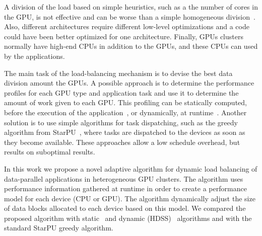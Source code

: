 \documentclass[journal]{IEEEtran}
\begin{document}
A division of the load based on simple heuristics, such as a the number of cores
in the GPU, is not effective and can be worse than a simple homogeneous
division~\cite{raphael}. Also, different architectures require different
low-level optimizations and a code could have been better optimized for one
architecture. Finally, GPUs clusters normally have high-end CPUs in addition to
the GPUs, and these CPUs can used by the applications.

%

The main task of the load-balancing mechanism is to devise the best data
division amount the GPUs. A possible approach is to determine the performance
profiles for each GPU type and application task and use it to determine the
amount of work given to each GPU. This profiling can be statically computed, before the
execution of the application~\cite{raphael}, or dynamically, at runtime~\cite{acosta, HDSS}. Another solution is to use simple algorithms for
task dispatching, such as the greedy algorithm from StarPU~\cite{starpu}, where
tasks are dispatched to the devices as soon as they become available. These approaches allow a low schedule overhead, but results on suboptimal results.

In this work we propose a novel adaptive algorithm for dynamic load balancing of
data-parallel applications in heterogeneous GPU clusters. The algorithm uses
performance information gathered at runtime in order to create a performance model for each
device (CPU or GPU). The algorithm dynamically adjust the size of data blocks
allocated to each device based on this model. We compared the proposed algorithm
with static~\cite{raphael} and dynamic (HDSS)~\cite{HDSS} algorithms and with
the standard StarPU greedy algorithm.

% 
% 
% 
% 
\end{document}
